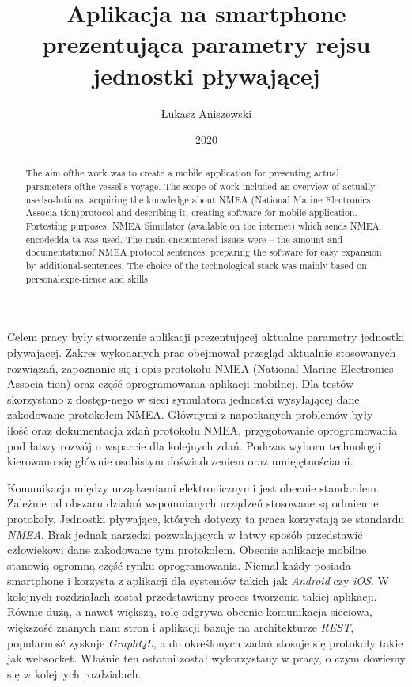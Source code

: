 \documentclass[skorowidz,skroty]{dyplomWEZUT}
\author{Łukasz Aniszewski}
\title{Aplikacja na smartphone prezentująca parametry rejsu jednostki pływającej}
\date{2020}
\begin{document}
\begin{streszczenie}
Celem pracy były stworzenie aplikacji prezentującej aktualne parametry jednostki pływającej. Zakres wykonanych prac obejmował przegląd aktualnie stosowanych rozwiązań, zapoznanie się i opis protokołu NMEA (National Marine Electronics Associa-tion) oraz część oprogramowania aplikacji mobilnej. Dla testów skorzystano z dostęp-nego   w sieci symulatora jednostki wysyłającej dane zakodowane protokołem NMEA. Głównymi z napotkanych problemów były – ilość oraz dokumentacja zdań protokołu NMEA, przygotowanie oprogramowania pod łatwy rozwój o wsparcie dla kolejnych zdań. Podczas wyboru technologii kierowano się głównie osobistym doświadczeniem oraz umiejętnościami. 
\end{streszczenie}

\begin{abstract}
The aim ofthe work was to create a mobile application for presenting actual parameters ofthe vessel's voyage. The scope of work included an overview of actually usedso-lutions, acquiring the knowledge about NMEA (National Marine Electronics Associa-tion)protocol and describing it, creating software for mobile application. Fortesting purposes, NMEA Simulator (available on the internet) which sends NMEA encodedda-ta was used. The main encountered issues were – the amount and documentationof NMEA protocol sentences, preparing the software for easy expansion by additional-sentences. The choice of the technological stack was mainly based on personalexpe-rience and skills.
\end{abstract}

\maketitle

\begin{wprowadzenie}

Komunikacja między urządzeniami elektronicznymi jest obecnie standardem. Zależnie od obszaru działań wspomnianych urządzeń stosowane są odmienne protokoły. Jednostki pływające, których dotyczy ta praca korzystają ze standardu \textit{NMEA}. Brak jednak narzędzi pozwalających w łatwy sposób przedstawić człowiekowi dane zakodowane tym protokołem. Obecnie aplikacje mobilne stanowią ogromną część rynku oprogramowania. Niemal każdy posiada smartphone i korzysta z aplikacji dla systemów takich jak \textit{Android} czy \textit{iOS}. W kolejnych rozdziałach został przedstawiony proces tworzenia takiej aplikacji. Równie dużą, a nawet większą, rolę odgrywa obecnie komunikacja sieciowa, większość znanych nam stron i aplikacji bazuje na architekturze \textit{REST}, popularność zyskuje \textit{GraphQL}, a do określonych zadań stosuje się protokoły takie jak websocket. Właśnie ten ostatni został wykorzystany w pracy, o czym dowiemy się w kolejnych rozdziałach. 

\end{wprowadzenie}
\end{document}
